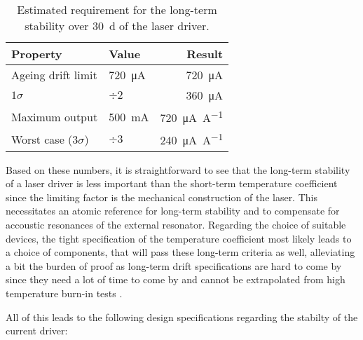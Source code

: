 \begin{table}[hb]
    \centering
    \begin{tabular}{llr}
        \toprule
        Property& Value& Result \\
        \midrule
        Ageing drift limit & \qty{720}{\uA}& \qty{720}{\uA}\\
        $1 \sigma$  & $\div 2$& \qty{360}{\uA} \\
        Maximum output& \qty{500}{\mA}& \qty{720}{\uA \per \A}\\
        Worst case ($3 \sigma$)& $\div 3$& \qty{240}{\uA \per \A}\\
        \bottomrule
    \end{tabular}
    \caption{Estimated requirement for the long-term stability over \qty{30}{\day} of the laser driver.}
    \label{tab:dgdrive_stability}
\end{table}

Based on these numbers, it is straightforward to see that the long-term stability of a laser driver is less important than the short-term temperature coefficient since the limiting factor is the mechanical construction of the laser. This necessitates an atomic reference for long-term stability and to compensate for accoustic resonances of the external resonator. Regarding the choice of suitable devices, the tight specification of the temperature coefficient most likely leads to a choice of components, that will pass these long-term criteria as well, alleviating a bit the burden of proof as long-term drift specifications are hard to come by since they need a lot of time to come by and cannot be extrapolated from high temperature burn-in tests \cite{voltage_reference_drift}.


All of this leads to the following design specifications regarding the stabilty of the current driver:

